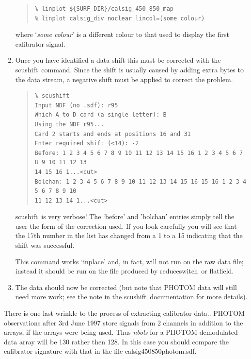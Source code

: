 \documentclass[twoside,11pt]{article}
\newcommand{\task}[1]{{\sf #1}}
\newcommand{\resw}{\htmlref{\task{reduce\_switch}}{REDUCE_SWITCH}}
\newcommand{\flatf}{\htmlref{\task{flatfield}}{FLATFIELD}}
\newcommand{\scushift}{\htmlref{\task{scushift}}{SCUSHIFT}}
\newenvironment{myquote}{\begin{quote}\begin{small}}{\end{small}\end{quote}}
\newcommand{\htmlref}[2]{#1}
\renewcommand{\_}{\texttt{\symbol{95}}}
\begin{document}
\begin{enumerate}
\begin{myquote}
\begin{verbatim}
% linplot ${SURF_DIR}/calsig_450_850_map
% linplot calsig_div noclear lincol=(some colour)
\end{verbatim}
\end{myquote}
where `\textit{some colour}' is a different colour to that used to display
the first calibrator signal.

\item Once you have identified a data shift this must be corrected with the
\scushift\ command. Since the shift is usually caused by adding extra bytes to 
the data stream, a negative shift must be applied to correct the problem.

\begin{myquote}
\begin{verbatim}
% scushift
Input NDF (no .sdf): r95
Which A to D card (a single letter): B
Using the NDF r95...
Card 2 starts and ends at positions 16 and 31
Enter required shift (<14): -2
Before: 1 2 3 4 5 6 7 8 9 10 11 12 13 14 15 16 1 2 3 4 5 6 7 8 9 10 11 12 13 
14 15 16 1...<cut>
Bolchan: 1 2 3 4 5 6 7 8 9 10 11 12 13 14 15 16 15 16 1 2 3 4 5 6 7 8 9 10 
11 12 13 14 1...<cut>
\end{verbatim}
\end{myquote}
\scushift\ is very verbose! The `before' and 'bolchan' entries simply tell the
user the form of the correction used. If you look carefully you will see
 that the 17th number in the list has changed from a 1 to a 15 indicating that 
the shift was successful.

This command works `inplace' and, in fact, will not run on the raw data file;
instead it should be run on the file produced by \resw\ or \flatf.

\item The data should now be corrected (but note that PHOTOM data will still
need more work; see the note in the \scushift\ documentation for more details).

\end{enumerate}


There is one last wrinkle to the process of extracting calibrator
data.. PHOTOM observations after 3rd June 1997 store signals from 2 channels
in addition to the arrays, if the arrays were being used.  Thus
\textit{n\_bols} for a PHOTOM demodulated data array will be 130 rather then
128. In this case you should compare the calibrator signature with that in the
file calsig\_450\_850\_photom.sdf.
\end{document}
